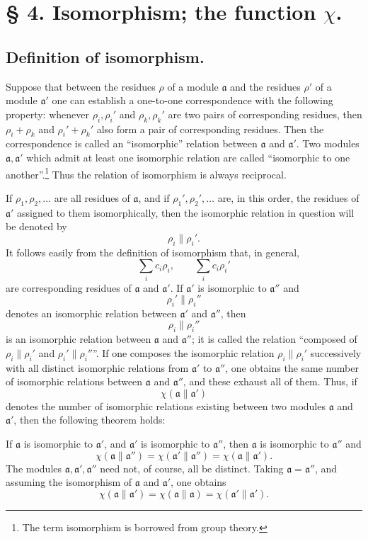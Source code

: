 \section*{§ 4. Isomorphism; the function $\chi$.}

\subsection*{Definition of isomorphism.}

Suppose that between the residues $\rho$ of a module $\mathfrak a$ and the residues $\rho'$ of a module $\mathfrak a'$ one can establish a one-to-one correspondence with the following property: whenever $\rho_i,\rho_i'$ and $\rho_k,\rho_k'$ are two pairs of corresponding residues, then $\rho_i+\rho_k$ and $\rho_i'+\rho_k'$ also form a pair of corresponding residues. Then the correspondence is called an ``isomorphic'' relation between $\mathfrak a$ and $\mathfrak a'$. Two modules $\mathfrak a,\mathfrak a'$ which admit at least one isomorphic relation are called ``isomorphic to one another''.\footnote{The term isomorphism is borrowed from group theory.} Thus the relation of isomorphism is always reciprocal.

If $\rho_1,\rho_2,\ldots$ are all residues of $\mathfrak a$, and if $\rho_1',\rho_2',\ldots$ are, in this order, the residues of $\mathfrak a'$ assigned to them isomorphically, then the isomorphic relation in question will be denoted by
\[
 \rho_i\parallel \rho_i'.
\]
It follows easily from the definition of isomorphism that, in general,
\[
 \sum_i c_i\rho_i,
 \qquad
 \sum_i c_i\rho_i'
\]
are corresponding residues of $\mathfrak a$ and $\mathfrak a'$. If $\mathfrak a'$ is isomorphic to $\mathfrak a''$ and
\[
 \rho_i'\parallel \rho_i''
\]
denotes an isomorphic relation between $\mathfrak a'$ and $\mathfrak a''$, then
\[
 \rho_i\parallel \rho_i''
\]
is an isomorphic relation between $\mathfrak a$ and $\mathfrak a''$; it is called the relation ``composed of $\rho_i\parallel\rho_i'$ and $\rho_i'\parallel\rho_i''$''. If one composes the isomorphic relation $\rho_i\parallel\rho_i'$ successively with all distinct isomorphic relations from $\mathfrak a'$ to $\mathfrak a''$, one obtains the same number of isomorphic relations between $\mathfrak a$ and $\mathfrak a''$, and these exhaust all of them. Thus, if
\[
 \chi(\mathfrak a\parallel\mathfrak a')
\]
denotes the number of isomorphic relations existing between two modules $\mathfrak a$ and $\mathfrak a'$, then the following theorem holds:

If $\mathfrak a$ is isomorphic to $\mathfrak a'$, and $\mathfrak a'$ is isomorphic to $\mathfrak a''$, then $\mathfrak a$ is isomorphic to $\mathfrak a''$ and
\[
 \chi(\mathfrak a\parallel\mathfrak a'')=
 \chi(\mathfrak a'\parallel\mathfrak a'')=
 \chi(\mathfrak a\parallel\mathfrak a').
\]
The modules $\mathfrak a,\mathfrak a',\mathfrak a''$ need not, of course, all be distinct. Taking $\mathfrak a=\mathfrak a''$, and assuming the isomorphism of $\mathfrak a$ and $\mathfrak a'$, one obtains
\[
 \chi(\mathfrak a\parallel\mathfrak a')=
 \chi(\mathfrak a\parallel\mathfrak a)=
 \chi(\mathfrak a'\parallel\mathfrak a').
\]

